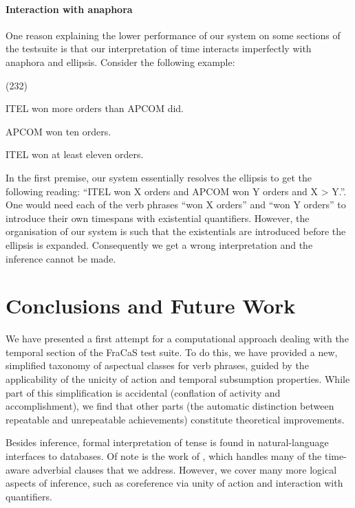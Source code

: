 \documentclass[a4paper,twoside]{article}
\newcommand\hyp{\item[H]}
\newcommand\fracasex[2]{\begin{lingex}\item[(#1)] \begin{subex} #2 \end{subex} \end{lingex} }
\begin{document}
\paragraph{Interaction with anaphora}
\label{sec:interaction-with-anaphora}
One reason explaining the lower performance of our system on some
sections of the testsuite is that our interpretation of time interacts
imperfectly with anaphora and ellipsis. Consider the following example:

\fracasex{232}
{\item	ITEL won more orders than APCOM did.
\item	APCOM won ten orders.
\hyp 	ITEL won at least eleven orders.
}

In the first premise, our system essentially resolves the ellipsis to
get the following reading: ``ITEL won X orders and APCOM won Y orders
and X > Y.''. One would need each of the verb phrases ``won X orders''
and ``won Y orders'' to introduce their own timespans with existential
quantifiers. However, the organisation of our system is such that the
existentials are introduced before the ellipsis is
expanded. Consequently we get a wrong interpretation and the inference
cannot be made.

\section{Conclusions and Future Work}
\label{sec:conclusion}

We have presented a first attempt for a computational approach dealing
with the temporal section of the FraCaS test suite. To do this, we
have provided a new, simplified taxonomy of aspectual classes for verb
phrases, guided by the applicability of the unicity of action and
temporal subsumption properties. While part of this simplification is
accidental (conflation of activity and accomplishment), we find that
other parts (the automatic distinction between repeatable and
unrepeatable achievements) constitute theoretical improvements.

Besides inference, formal interpretation of tense is found in
natural-language interfaces to databases. Of note is the work of
\citet{androutsopoulos1998time}, which handles many of the time-aware
adverbial clauses that we address. However, we cover many more
 logical aspects of inference, such as coreference via
unity of action and interaction with quantifiers.
\end{document}
